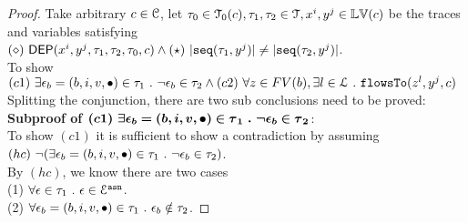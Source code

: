 \begin{proof}
Take arbitrary $c \in \mathcal{C}$,
%
let $\mathtt{\tau}_0 \in \mathcal{T}_0(c), \mathtt{\tau}_1, \mathtt{\tau}_2 \in \mathcal{T}, x^i, y^j \in \mathbb{LV}(c)$ be the traces and variables satisfying 
$(\diamond)~\dep(x^i, y^j, \trace_1, \trace_2 , \trace_0, c) 
\land
(\star)~|\seq(\trace_1, y^j)| \neq |\seq(\trace_2, y^j)|$.
\\
To show 
$(c1)~\exists \mathtt{\epsilon}_b = (b, i, v, \bullet) \in \mathtt{\tau}_1 ~.~ \neg \mathtt{\epsilon}_b \in \mathtt{\tau}_2
\land 
(c2)~\forall z \in FV(b), \exists l \in \mathcal{L} ~.~ \mathtt{flowsTo}(z^l, y^j, c)$
\\
Splitting the conjunction, there are two sub conclusions need to be proved:
\\
\textbf{Subproof of $\boldsymbol{(c1)~\exists \mathtt{\epsilon}_b = (b, i, v, \bullet) \in \mathtt{\tau}_1 ~.~ \neg \mathtt{\epsilon}_b \in \mathtt{\tau}_2}$}:
\\
To show $(c1)$
it is sufficient to show a contradiction by assuming 
\\
$(hc)~\neg (\exists \mathtt{\epsilon}_b = (b, i, v, \bullet) \in \mathtt{\tau}_1 ~.~ \neg \mathtt{\epsilon}_b \in \mathtt{\tau}_2)$.
\\
By $(hc)$, we know there are two cases
\\
(1) $\forall \mathtt{\epsilon} \in \mathtt{\tau}_1 ~.~ \mathtt{\epsilon} \in \mathcal{E}^{\mathtt{{asn}}}$.
\\
(2) $\forall \mathtt{\epsilon}_b = (b, i, v, \bullet) \in \mathtt{\tau}_1 ~.~ 
\mathtt{\epsilon}_b \notin \mathtt{\tau}_2$.
%

\end{proof}

